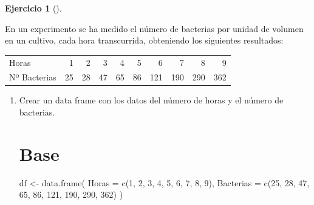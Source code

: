 \documentclass[
  a4paper,
]{scrreport}
\newenvironment{Shaded}{\begin{snugshade}}{\end{snugshade}}
\newcommand{\AttributeTok}[1]{\textcolor[rgb]{0.40,0.45,0.13}{#1}}
\newcommand{\DecValTok}[1]{\textcolor[rgb]{0.68,0.00,0.00}{#1}}
\newcommand{\FunctionTok}[1]{\textcolor[rgb]{0.28,0.35,0.67}{#1}}
\newcommand{\NormalTok}[1]{\textcolor[rgb]{0.00,0.23,0.31}{#1}}
\newcommand{\OtherTok}[1]{\textcolor[rgb]{0.00,0.23,0.31}{#1}}
\theoremstyle{definition}
\newtheorem{exercise}{Ejercicio}[chapter]
\theoremstyle{remark}
\begin{document}
\begin{exercise}[]\protect\hypertarget{exr-regresion-4}{}\label{exr-regresion-4}

En un experimento se ha medido el número de bacterias por unidad de
volumen en un cultivo, cada hora transcurrida, obteniendo los siguientes
resultados:

\begin{longtable}[]{@{}lrrrrrrrrr@{}}
\toprule\noalign{}
\endhead
\bottomrule\noalign{}
\endlastfoot
Horas & 1 & 2 & 3 & 4 & 5 & 6 & 7 & 8 & 9 \\
Nº Bacterias & 25 & 28 & 47 & 65 & 86 & 121 & 190 & 290 & 362 \\
\end{longtable}

\begin{enumerate}
\def\labelenumi{\alph{enumi}.}
\item
  Crear un data frame con los datos del número de horas y el número de
  bacterias.

  \begin{tcolorbox}[enhanced jigsaw, colframe=quarto-callout-tip-color-frame, toprule=.15mm, bottomtitle=1mm, breakable, opacitybacktitle=0.6, toptitle=1mm, colback=white, bottomrule=.15mm, title=\textcolor{quarto-callout-tip-color}{\faLightbulb}\hspace{0.5em}{Solución}, arc=.35mm, left=2mm, titlerule=0mm, rightrule=.15mm, coltitle=black, leftrule=.75mm, opacityback=0, colbacktitle=quarto-callout-tip-color!10!white]

  \section{Base}

\begin{Shaded}
\begin{Highlighting}[]
\NormalTok{df }\OtherTok{\textless{}{-}} \FunctionTok{data.frame}\NormalTok{(}
    \AttributeTok{Horas =} \FunctionTok{c}\NormalTok{(}\DecValTok{1}\NormalTok{, }\DecValTok{2}\NormalTok{, }\DecValTok{3}\NormalTok{, }\DecValTok{4}\NormalTok{, }\DecValTok{5}\NormalTok{, }\DecValTok{6}\NormalTok{, }\DecValTok{7}\NormalTok{, }\DecValTok{8}\NormalTok{, }\DecValTok{9}\NormalTok{),}
    \AttributeTok{Bacterias =} \FunctionTok{c}\NormalTok{(}\DecValTok{25}\NormalTok{, }\DecValTok{28}\NormalTok{, }\DecValTok{47}\NormalTok{, }\DecValTok{65}\NormalTok{, }\DecValTok{86}\NormalTok{, }\DecValTok{121}\NormalTok{, }\DecValTok{190}\NormalTok{, }\DecValTok{290}\NormalTok{, }\DecValTok{362}\NormalTok{)}
\NormalTok{)}
\end{Highlighting}
\end{Shaded}


\end{tcolorbox}
\end{enumerate}
\end{exercise}
\end{document}
